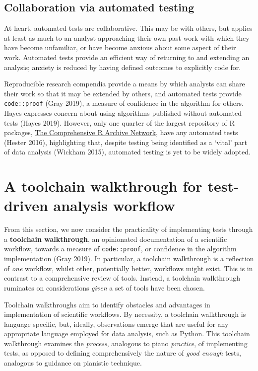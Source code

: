 \documentclass[
]{article}
\begin{document}
\hypertarget{collaboration-via-automated-testing}{%
\subsection{Collaboration via automated testing}\label{collaboration-via-automated-testing}}

At heart, automated tests are collaborative. This may be with others, but applies at least as much to an analyst approaching their own past work with which they have become unfamiliar, or have become anxious about some aspect of their work. Automated tests provide an efficient way of returning to and extending an analysis; anxiety is reduced by having defined outcomes to explicitly code for.

Reproducible research compendia provide a means by which analysts can share their work so that it may be extended by others, and automated tests provide \texttt{code::proof} (Gray 2019), a measure of confidence in the algorithm for others. Hayes expresses concern about using algorithms published without automated tests (Hayes 2019). However, only one quarter of the largest repository of R packages, \href{https://cran.r-project.org/}{The Comprehensive R Archive Network}, have any automated tests (Hester 2016), highlighting that, despite testing being identified as a `vital' part of data analysis (Wickham 2015), automated testing is yet to be widely adopted.

\hypertarget{a-toolchain-walkthrough-for-test-driven-analysis-workflow}{%
\section{A toolchain walkthrough for test-driven analysis workflow}\label{a-toolchain-walkthrough-for-test-driven-analysis-workflow}}

From this section, we now consider the practicality of implementing tests through a \textbf{toolchain walkthrough}, an opinionated documentation of a scientific workflow, towards a measure of \texttt{code::proof}, or confidence in the algorithm implementation (Gray 2019). In particular, a toolchain walkthrough is a reflection of \emph{one} workflow, whilst other, potentially better, workflows might exist. This is in contrast to a comprehensive review of tools. Instead, a toolchain walkthrough ruminates on considerations \emph{given} a set of tools have been chosen.

Toolchain walkthroughs aim to identify obstacles and advantages in implementation of scientific workflows. By necessity, a toolchain walkthrough is language specific, but, ideally, observations emerge that are useful for any appropriate language employed for data analysis, such as Python. This toolchain walkthrough examines the \emph{process}, analogous to piano \emph{practice}, of implementing tests, as opposed to defining comprehensively the nature of \emph{good enough} tests, analogous to guidance on pianistic technique.
\end{document}
